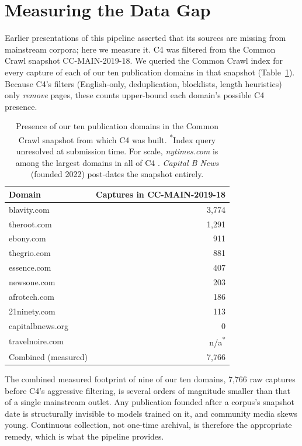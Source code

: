 \documentclass[letterpaper]{article}
\begin{document}
\section{Measuring the Data Gap}
\label{sec:gap}

Earlier presentations of this pipeline asserted that its sources are
missing from mainstream corpora; here we measure it. C4
\citep{raffel2020} was filtered from the Common Crawl snapshot
CC-MAIN-2019-18. We queried the Common Crawl index for every capture of
each of our ten publication domains in that snapshot
(Table~\ref{tab:audit}). Because C4's filters (English-only,
deduplication, blocklists, length heuristics) only \emph{remove} pages,
these counts upper-bound each domain's possible C4 presence.

\begin{table}[t]
\centering
\small
\begin{tabular}{lr}
\toprule
Domain & Captures in CC-MAIN-2019-18 \\
\midrule
blavity.com        & 3{,}774 \\
theroot.com        & 1{,}291 \\
ebony.com          &   911 \\
thegrio.com        &   881 \\
essence.com        &   407 \\
newsone.com        &   203 \\
afrotech.com       &   186 \\
21ninety.com       &   113 \\
capitalbnews.org   &     0 \\
travelnoire.com    &   n/a\textsuperscript{*} \\
\midrule
Combined (measured) & 7{,}766 \\
\bottomrule
\end{tabular}
\caption{Presence of our ten publication domains in the Common Crawl
snapshot from which C4 was built. \textsuperscript{*}Index query
unresolved at submission time. For scale, \emph{nytimes.com} is among
the largest domains in all of C4 \citep{dodge2021}. \emph{Capital B News}
(founded 2022) post-dates the snapshot entirely.}
\label{tab:audit}
\end{table}

The combined measured footprint of nine of our ten domains, 7,766 raw
captures before C4's aggressive filtering, is several orders of
magnitude smaller than that of a single mainstream outlet. Any
publication founded after a corpus's snapshot date is structurally
invisible to models trained on it, and community media skews young.
Continuous collection, not one-time archival, is therefore the
appropriate remedy, which is what the pipeline provides.
\end{document}
